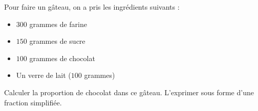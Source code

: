 
\begin{exercice}\label{exosmath-0893}

Pour faire un gâteau, on a pris les ingrédients suivants :
\begin{itemize}
    \item 
 $300$ grammes de farine
 \item
 $150$ grammes de sucre
 \item
 $100$ grammes de chocolat
 \item
 Un verre de lait ($100$ grammes)
\end{itemize}
Calculer la proportion de chocolat dans ce gâteau. L'exprimer sous forme d'une fraction simplifiée.

\end{exercice}
